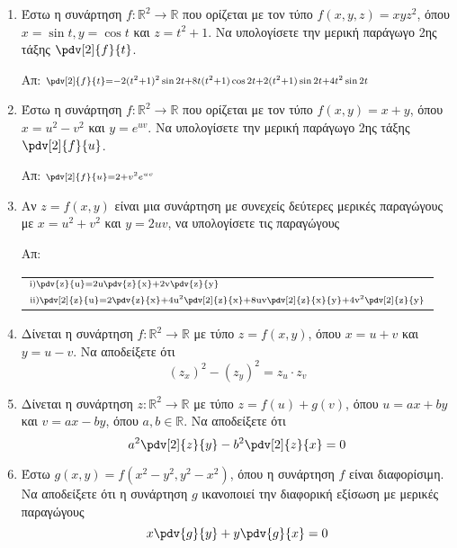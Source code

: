 \begin{enumerate}
 \item Έστω η συνάρτηση $ f : \mathbb{R}^{2} \to \mathbb{R} $ που ορίζεται με τον τύπο $ f(x,y,z) =
	 xyz^{2}$, όπου $ x = \sin{t}, y = \cos{t} $ και $ z = t^{2}+1 $. Να υπολογίσετε την μερική
	 παράγωγο 2ης τάξης $ \pdv[2]{f}{t} $.

	 \hfill Απ: $\scriptstyle{\pdv[2]{f}{t} = -2(t^{2}+1)^{2} \sin{2t} + 8t(t^{2}+1) \cos{2t} +
	 2(t^{2}+1) \sin{2t} + 4t^{2} \sin{2t}}$

 \item Έστω η συνάρτηση $ f : \mathbb{R}^{2} \to \mathbb{R} $ που ορίζεται με τον τύπο $ f(x,y) =
	 x+y$, όπου $ x = u^{2} - v^{2} $ και $ y = e^{uv} $. Να υπολογίσετε την μερική παράγωγο 2ης
	 τάξης $ \pdv[2]{f}{u} $.

	 \hfill Απ: $ \scriptstyle{\pdv[2]{f}{u} = 2 + v^{2}e^{uv}} $

 \item Αν $ z=f(x,y) $ είναι μια συνάρτηση με συνεχείς δεύτερες μερικές παραγώγους με $
	 x=u^{2}+v^{2} $ και $ y = 2uv $, να υπολογίσετε τις παραγώγους
	 \begin{enumerate*}[i)]
		 \item $\pdv{z}{u}$
		 \item $\pdv[2]{z}{u}$
	 \end{enumerate*}

	 \hfill Απ:  \begin{tabular}{l}
		 $\scriptstyle{\rm{i})  \pdv{z}{u} = 2u\pdv{z}{x}+2v\pdv{z}{y}}  $ \\
		 $\scriptstyle{\rm{ii}) \pdv[2]{z}{u} =
		 2\pdv{z}{x}+4u^{2}\pdv[2]{z}{x}+8uv\pdv[2]{z}{x}{y}+4v^{2}\pdv[2]{z}{y}} $
	 \end{tabular}


 \item Δίνεται η συνάρτηση $ f : \mathbb{R}^{2} \to \mathbb{R} $ με τύπο $ z=f(x,y) $, όπου $ x=u+v
	 $ και $ y = u-v $. Να αποδείξετε ότι 
	 \[
		 (z_{x})^{2} - (z_{y})^{2} = z_{u}\cdot z_{v} 
	 \] 

 \item Δίνεται η συνάρτηση $ z : \mathbb{R} ^{2} \to \mathbb{R} $ με τύπο $ z = f(u) + g(v) $, όπου
	 $ u = ax + by $ και $ v = ax - by $, όπου $ a,b \in \mathbb{R} $. Να αποδείξετε ότι 
	 \[
		 a^{2}\pdv[2]{z}{y} - b^{2}\pdv[2]{z}{x} = 0 
	 \] 
	 

 \item Έστω $ g(x,y) = f(x^{2} - y^{2}, y^{2} - x^{2}) $, όπου η συνάρτηση $f$ είναι διαφορίσιμη. Να
	 αποδείξετε ότι η συνάρτηση $g$ ικανοποιεί την διαφορική εξίσωση με μερικές παραγώγους
	 \[
		 x\pdv{g}{y} + y\pdv{g}{x} = 0
	 \] 


\end{enumerate}
